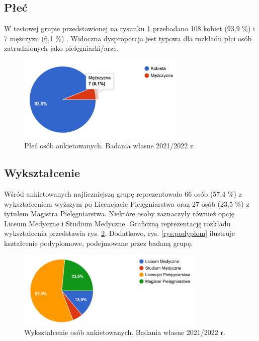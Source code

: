 \documentclass[a4paper,12pt,twoside,openany]{report}
\begin{document}
\subsection{Płeć}

W testowej grupie przedstawionej na rysunku \ref{rys:plec} przebadano 108 kobiet 
(93,9 \%) i 7 mężczyzn (6,1 \%) . Widoczna dysproporcja jest typowa dla rozkładu płci osób zatrudnionych jako pielęgniarki/arze.

\begin{figure}
\includegraphics[width=8cm]{char_gr_bad/plec00}
\caption{Płeć osób ankietowanych. Badania własne 2021/2022 r.}
\label{rys:plec}
\end{figure}


\subsection{Wykształcenie}

Wśród ankietowanych najliczniejszą grupę reprezentowało 66 osób (57,4 \%) z wykształceniem wyższym po Licencjacie Pielęgniarstwa oraz 27 osób (23,5 \%) z tytułem Magistra Pielęgniarstwa. Niektóre osoby zaznaczyły również opcję Liceum Medyczne i  Studium Medyczne. Graficzną reprezentację rozkładu wykształcenia przedstawia rys. \ref{rys:wykszt}. Dodatkowo, rys. \ref{rys:podyplom} ilustruje kształcenie podyplomowe, podejmowane przez badaną grupę.

\begin{figure}
\includegraphics[width=9cm]{char_gr_bad/wyksztalc00}
\caption{Wykształcenie osób ankietowanych. Badania własne 2021/2022 r.}
\label{rys:wykszt}
\end{figure}
\end{document}
